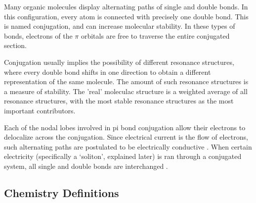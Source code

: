\documentclass[12pt]{article}
\begin{document}
Many organic molecules display alternating paths of single and double bonds. In this configuration, every atom is connected with precisely one double bond. This is named conjugation, and can increase molecular stability. In these types of bonds, electrons of the $\pi$ orbitals are free to traverse the entire conjugated section. 

Conjugation usually implies the possibility of different resonance structures, where every double bond shifts in one direction to obtain a different representation of the same molecule. The amount of such resonance structures is a measure of stability.  The 'real' moleculac structure is a weighted average of all resonance structures, with the most stable resonance structures as the most important contributors.

Each of the nodal lobes involved in pi bond conjugation allow their electrons to delocalize across the conjugation. Since electrical current is the flow of electrons, such alternating paths are postulated to be electrically conductive \cite{H13,HK88}. When certain electricity (specifically a `soliton', explained later) is ran through a conjugated system, all single and double bonds are interchanged \cite{HK88}. 

\subsection{Chemistry Definitions}
\end{document}
